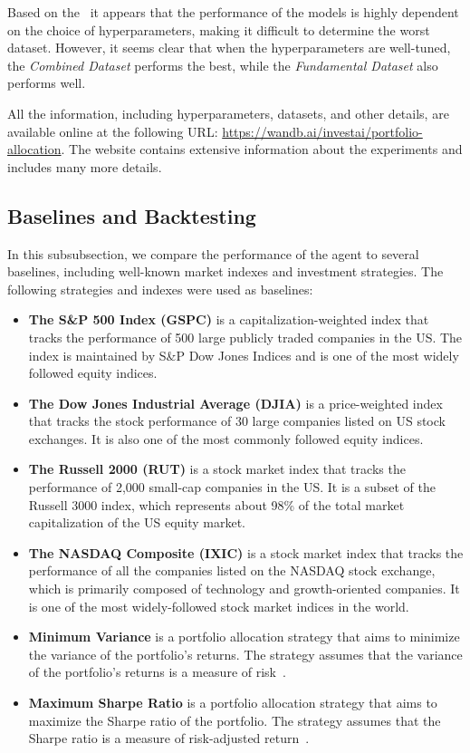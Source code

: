 \documentclass[../xlapes02]{subfiles}
\begin{document}
    Based on the~ it appears that the performance of the models is highly dependent on the choice of hyperparameters, making it difficult to determine the worst dataset. However, it seems clear that when the hyperparameters are well-tuned, the \emph{Combined Dataset} performs the best, while the \emph{Fundamental Dataset} also performs well.

    All the information, including hyperparameters, datasets, and other details, are available online at the following URL: \url{https://wandb.ai/investai/portfolio-allocation}. The website contains extensive information about the experiments and includes many more details.

    \subsection{Baselines and Backtesting}\label{subsec:baselines-and-backtesting}
    In this subsubsection, we compare the performance of the agent to several baselines, including well-known market indexes and investment strategies. The following strategies and indexes were used as baselines:

    \begin{itemize}
        \item \textbf{The S\&P 500 Index (GSPC)} is a capitalization-weighted index that tracks the performance of 500 large publicly traded companies in the US. The index is maintained by S\&P Dow Jones Indices and is one of the most widely followed equity indices.
        \item \textbf{The Dow Jones Industrial Average (DJIA)} is a price-weighted index that tracks the stock performance of 30 large companies listed on US stock exchanges. It is also one of the most commonly followed equity indices.
        \item \textbf{The Russell 2000 (RUT)} is a stock market index that tracks the performance of 2,000 small-cap companies in the US. It is a subset of the Russell 3000 index, which represents about 98\% of the total market capitalization of the US equity market.
        \item \textbf{The NASDAQ Composite (IXIC)} is a stock market index that tracks the performance of all the companies listed on the NASDAQ stock exchange, which is primarily composed of technology and growth-oriented companies. It is one of the most widely-followed stock market indices in the world.
        \item \textbf{Minimum Variance} is a portfolio allocation strategy that aims to minimize the variance of the portfolio's returns. The strategy assumes that the variance of the portfolio's returns is a measure of risk~\cite{investopedia-portfolio-variance}.
        \item \textbf{Maximum Sharpe Ratio} is a portfolio allocation strategy that aims to maximize the Sharpe ratio of the portfolio. The strategy assumes that the Sharpe ratio is a measure of risk-adjusted return~\cite{investopedia-sharpe-ratio}.
    \end{itemize}
\end{document}
